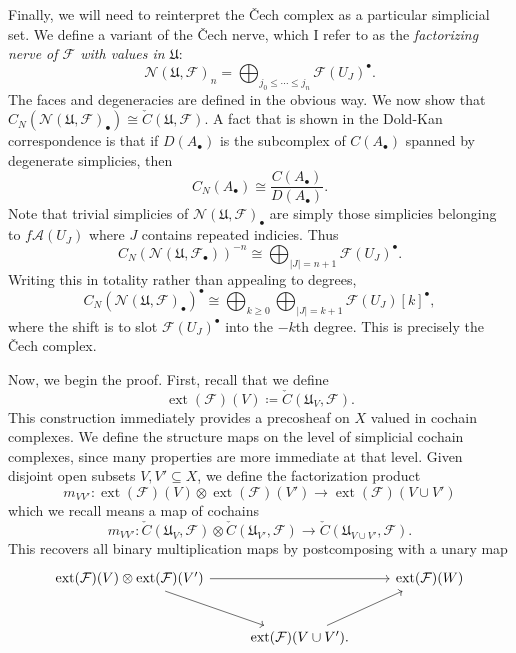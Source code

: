 Finally, we will need to reinterpret the \v{C}ech complex as a particular simplicial set. We define a variant of the \v{C}ech nerve, which I refer to as the \emph{factorizing nerve of $\mathcal{F} $ with values in $\mathfrak{U} $}:
\[
	\mathcal{N} (\mathfrak{U}, \mathcal{F})_n = \bigoplus_{j_0 \leq \cdots \leq j_n} \mathcal{F} (U_J)^{\bullet}
.\]
The faces and degeneracies are defined in the obvious way. We now show that $C_N(\mathcal{N} (\mathfrak{U} ,\mathcal{F} )_{\bullet} )\cong \check{C}(\mathfrak{U} ,\mathcal{F} )$. A fact that is shown in the Dold-Kan correspondence is that if $D(A_{\bullet} )$ is the subcomplex of $C(A_{\bullet} )$ spanned by degenerate simplicies, then
\[
	C_N(A_{\bullet} )\cong \frac{C(A_{\bullet} )}{D(A_{\bullet} )} 
.\]
Note that trivial simplicies of $\mathcal{N} (\mathfrak{U} ,\mathcal{F} )_{\bullet} $ are simply those simplicies belonging to $f\mathcal{A} (U_J)$ where $J$ contains repeated indicies. Thus
\[
	C_N(\mathcal{N} (\mathfrak{U} ,\mathcal{F} _{\bullet} ))^{-n}\cong \bigoplus_{\left| J \right| =n+1} \mathcal{F} (U_J)^{\bullet} 
.\]
Writing this in totality rather than appealing to degrees,
\[
	C_N(\mathcal{N} (\mathfrak{U} ,\mathcal{F} )_{\bullet} )^{\bullet} \cong \bigoplus_{k\geq 0} \bigoplus_{\left| J \right| =k+1} \mathcal{F} (U_J)[k]^{\bullet} ,
\]
where the shift is to slot $\mathcal{F} (U_J)^{\bullet} $ into the $-k$th degree. This is precisely the \v{C}ech complex.

Now, we begin the proof. First, recall that we define
\[
	\operatorname{ext} (\mathcal{F} )(V)\coloneqq \check{C}(\mathfrak{U} _V,\mathcal{F} )
.\]
This construction immediately provides a precosheaf on $X$ valued in cochain complexes. We define the structure maps on the level of simplicial cochain complexes, since many properties are more immediate at that level. Given disjoint open subsets $V,V' \subseteq X$, we define the factorization product
\[
	m_{VV'} : \operatorname{ext} (\mathcal{F} )(V)\otimes \operatorname{ext} (\mathcal{F} )(V') \to \operatorname{ext} (\mathcal{F} )(V \cup V')
\]
which we recall means a map of cochains
\[
	m_{VV'} : \check{C}(\mathfrak{U}_V,\mathcal{F} )\otimes \check{C}(\mathfrak{U}_{V'} ,\mathcal{F} ) \to \check{C}(\mathfrak{U} _{V\cup V'} , \mathcal{F} )
.\]
This recovers all binary multiplication maps by postcomposing with a unary map
\[\begin{tikzcd}[row sep = 2.5em, column sep = 2.5em]
\operatorname{ext} (\mathcal{F} )(V)\otimes \operatorname{ext} (\mathcal{F} )(V')\ar[rr] \ar[dr]  &  & \operatorname{ext} (\mathcal{F} )(W) \\
 & \operatorname{ext} (\mathcal{F} )(V \cup V') \ar[ur] . & 
\end{tikzcd}\]

